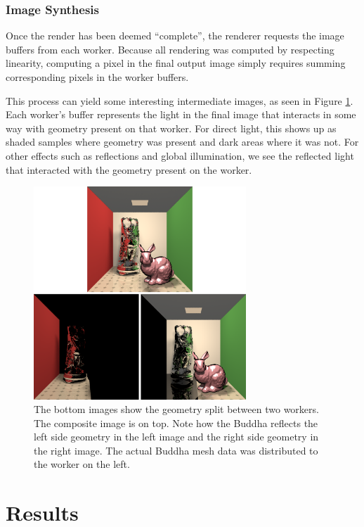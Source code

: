 \documentclass[a4paper,twoside]{article}
\begin{document}
\subsubsection{Image Synthesis}
\label{synthesis}

Once the render has been deemed ``complete'', the renderer requests the image
buffers from each worker. Because all rendering was computed by respecting
linearity, computing a pixel in the final output image simply requires summing
corresponding pixels in the worker buffers.

This process can yield some interesting intermediate images, as seen in Figure
\ref{fig:linearity}. Each worker's buffer represents the light in the final
image that interacts in some way with geometry present on that worker. For
direct light, this shows up as shaded samples where geometry was present and
dark areas where it was not. For other effects such as reflections and global
illumination, we see the reflected light that interacted with the geometry
present on the worker.

\begin{figure}[h!]
    \centering
    \includegraphics[width=80mm]{images/linearity.png}
    \caption{The bottom images show the geometry split between two workers. The composite image is on top. Note how the Buddha reflects the left side geometry in the left image and the right side geometry in the right image. The actual Buddha mesh data was distributed to the worker on the left.}
    \label{fig:linearity}
\end{figure}

\section{Results}
\label{results}
\end{document}
